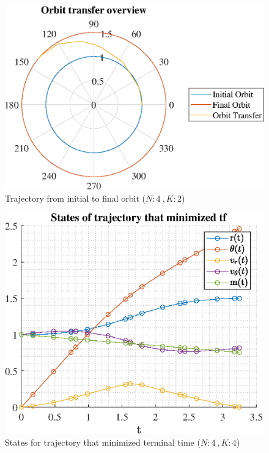 \documentclass[]{article}
\begin{document}
	\begin{figure}
		\centering
		\includegraphics[scale=0.75]{orbit_N4_K2_C3_tf.eps}
		\caption{Trajectory from initial to final orbit (\(N:4\ , K:2\))}
		\label{fig:orbit_N4_K2_C3_tf}
	\end{figure}
	\begin{figure}
		\centering
		\includegraphics[scale=0.75]{states_N4_K4_C3_tf.eps}
		\caption{States for trajectory that minimized terminal time (\(N:4\ , K:4\))}
		\label{fig:states_N4_K4_C3_tf}
	\end{figure}
\end{document}

